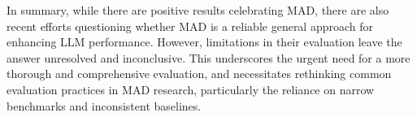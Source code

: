 In summary, while there are positive results celebrating MAD, there are also recent efforts questioning whether MAD is a reliable general approach for enhancing LLM performance.
However, limitations in their evaluation leave the answer unresolved and inconclusive.
This underscores the urgent need for a more thorough and comprehensive evaluation, and necessitates rethinking common evaluation practices in MAD research, particularly the reliance on narrow benchmarks and inconsistent baselines.  
